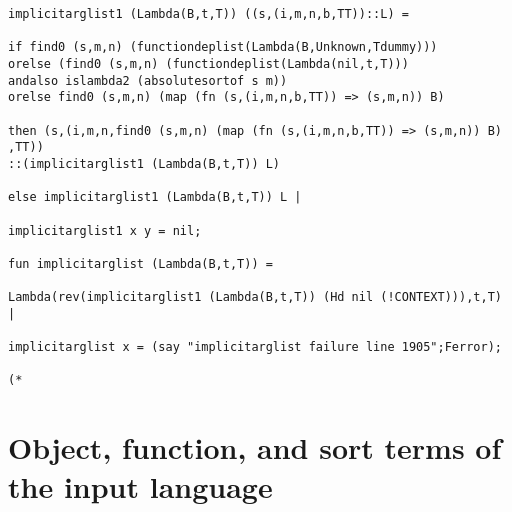 \documentclass[12pt]{article}
\begin{document}
\begin{verbatim}
implicitarglist1 (Lambda(B,t,T)) ((s,(i,m,n,b,TT))::L) =

if find0 (s,m,n) (functiondeplist(Lambda(B,Unknown,Tdummy)))
orelse (find0 (s,m,n) (functiondeplist(Lambda(nil,t,T))) 
andalso islambda2 (absolutesortof s m))
orelse find0 (s,m,n) (map (fn (s,(i,m,n,b,TT)) => (s,m,n)) B)

then (s,(i,m,n,find0 (s,m,n) (map (fn (s,(i,m,n,b,TT)) => (s,m,n)) B) ,TT))
::(implicitarglist1 (Lambda(B,t,T)) L)

else implicitarglist1 (Lambda(B,t,T)) L |

implicitarglist1 x y = nil;

fun implicitarglist (Lambda(B,t,T)) =

Lambda(rev(implicitarglist1 (Lambda(B,t,T)) (Hd nil (!CONTEXT))),t,T) |

implicitarglist x = (say "implicitarglist failure line 1905";Ferror);

(*

\end{verbatim}


\newpage

\section{Object, function, and sort terms of the input language}
\end{document}
